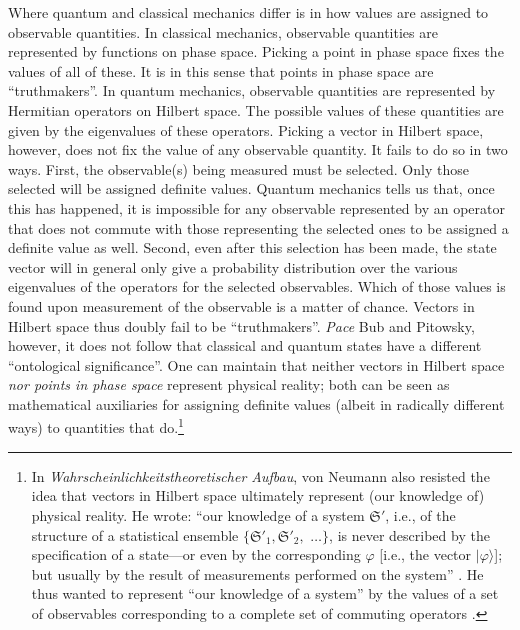 Where quantum and classical mechanics differ is in how values are assigned to observable quantities. In classical mechanics, observable quantities are represented by functions on phase space. Picking a point in phase space fixes the values of all of these. It is in this sense that points in phase space are ``truthmakers''. In quantum mechanics, observable quantities are represented by Hermitian operators on Hilbert space. The possible values of these quantities are given by the eigenvalues of these operators. Picking a vector in Hilbert space, however, does not fix the value of any observable quantity. It fails to do so in two ways. First, the observable(s) being measured must be selected. Only those selected will be assigned definite values. Quantum mechanics tells us that, once this has happened, it is impossible for any observable represented by an operator that does not commute with those representing the selected ones to be assigned a definite value as well. Second, even after this selection has been made, the state vector will in general only give a probability distribution over the various eigenvalues of the operators for the selected observables. Which of those values is found upon measurement of the observable is a matter of chance. Vectors in Hilbert space thus doubly fail to be ``truthmakers''. \emph{Pace} Bub and Pitowsky, however, it does not follow that classical and quantum states have a different ``ontological significance''. One can maintain that neither vectors in Hilbert space \emph{nor points in phase space} represent physical reality; both can be seen as mathematical auxiliaries for assigning definite values (albeit in radically different ways) to quantities that do.\footnote{In \emph{Wahrscheinlichkeitstheoretischer Aufbau}, von Neumann also resisted the idea that vectors in Hilbert space ultimately represent (our knowledge of) physical reality. He wrote: ``our knowledge  of a system $\mathfrak{S}'$, i.e., of the structure of a statistical ensemble $\{ \mathfrak{S}'_1, \mathfrak{S}'_2,$ $\ldots \}$, is never described by the specification of a state---or even by the corresponding $\varphi$ [i.e., the vector $| \varphi \rangle$]; but usually by the result of measurements performed on the system'' \citep[p.\ 260]{von Neumann 1927b}. He thus wanted to represent ``our knowledge  of a system'' by the values of a set of observables corresponding to a complete set of commuting operators \citep[pp.\ 251--251]{Duncan and Janssen 2013}.} 

